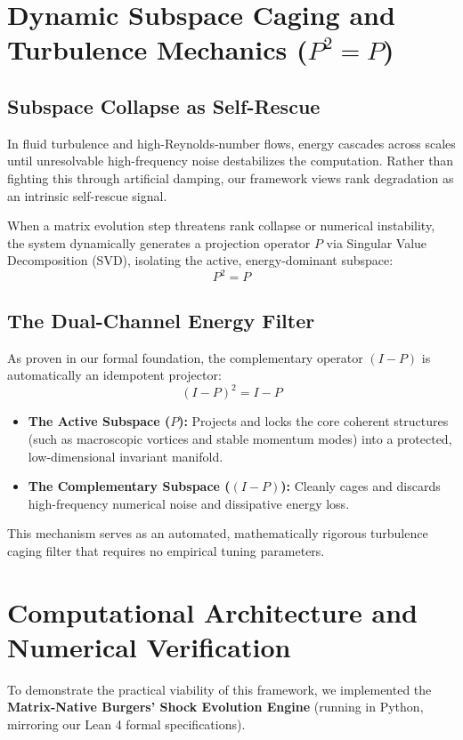 \documentclass[11pt,a4paper]{article}
\begin{document}
\section{Dynamic Subspace Caging and Turbulence Mechanics ($P^2 = P$)}

\subsection{Subspace Collapse as Self-Rescue}
In fluid turbulence and high-Reynolds-number flows, energy cascades across scales until unresolvable high-frequency noise destabilizes the computation. Rather than fighting this through artificial damping, our framework views rank degradation as an intrinsic self-rescue signal.

When a matrix evolution step threatens rank collapse or numerical instability, the system dynamically generates a projection operator $P$ via Singular Value Decomposition (SVD), isolating the active, energy-dominant subspace:
$$P^2 = P$$

\subsection{The Dual-Channel Energy Filter}
As proven in our formal foundation, the complementary operator $(I - P)$ is automatically an idempotent projector:
$$(I - P)^2 = I - P$$
\begin{itemize}
    \item \textbf{The Active Subspace ($P$):} Projects and locks the core coherent structures (such as macroscopic vortices and stable momentum modes) into a protected, low-dimensional invariant manifold.
    \item \textbf{The Complementary Subspace ($(I - P)$):} Cleanly cages and discards high-frequency numerical noise and dissipative energy loss.
\end{itemize}

This mechanism serves as an automated, mathematically rigorous turbulence caging filter that requires no empirical tuning parameters.

\section{Computational Architecture and Numerical Verification}

To demonstrate the practical viability of this framework, we implemented the \textbf{Matrix-Native Burgers' Shock Evolution Engine} (running in Python, mirroring our Lean 4 formal specifications). 
\end{document}

